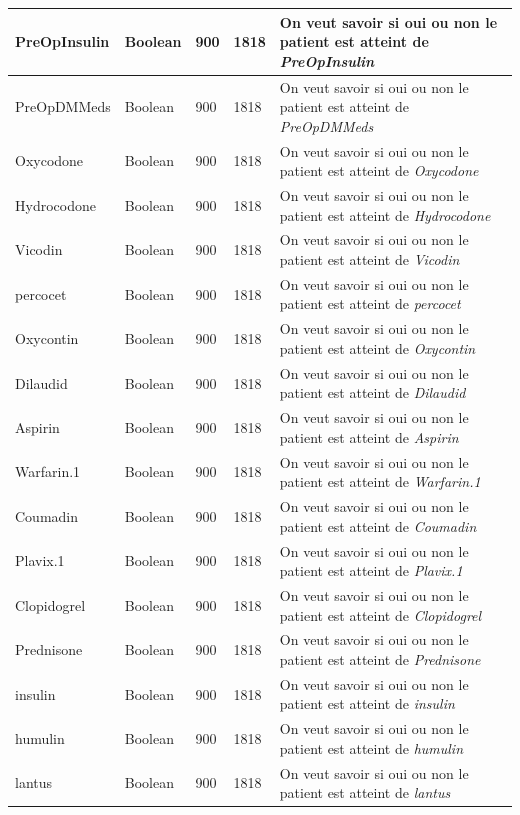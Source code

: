 \documentclass[12pt, french]{report}
\begin{document}
\begin{longtable}{ | p{} | p{} | p{}  | p{} | p{} |  }
PreOpInsulin & Boolean & 900 & 1818& On veut savoir si oui ou non le patient est atteint de \textit{PreOpInsulin} \\ \hline 
PreOpDMMeds & Boolean & 900 & 1818& On veut savoir si oui ou non le patient est atteint de \textit{PreOpDMMeds} \\ \hline 
Oxycodone & Boolean & 900 & 1818& On veut savoir si oui ou non le patient est atteint de \textit{Oxycodone} \\ \hline 
Hydrocodone & Boolean & 900 & 1818& On veut savoir si oui ou non le patient est atteint de \textit{Hydrocodone} \\ \hline 
Vicodin & Boolean & 900 & 1818& On veut savoir si oui ou non le patient est atteint de \textit{Vicodin} \\ \hline 
percocet & Boolean & 900 & 1818& On veut savoir si oui ou non le patient est atteint de \textit{percocet} \\ \hline 
Oxycontin & Boolean & 900 & 1818& On veut savoir si oui ou non le patient est atteint de \textit{Oxycontin} \\ \hline 
Dilaudid & Boolean & 900 & 1818& On veut savoir si oui ou non le patient est atteint de \textit{Dilaudid} \\ \hline 
Aspirin & Boolean & 900 & 1818& On veut savoir si oui ou non le patient est atteint de \textit{Aspirin} \\ \hline 
Warfarin.1 & Boolean & 900 & 1818& On veut savoir si oui ou non le patient est atteint de \textit{Warfarin.1} \\ \hline 
Coumadin & Boolean & 900 & 1818& On veut savoir si oui ou non le patient est atteint de \textit{Coumadin} \\ \hline 
Plavix.1 & Boolean & 900 & 1818& On veut savoir si oui ou non le patient est atteint de \textit{Plavix.1} \\ \hline 
Clopidogrel & Boolean & 900 & 1818& On veut savoir si oui ou non le patient est atteint de \textit{Clopidogrel} \\ \hline 
Prednisone & Boolean & 900 & 1818& On veut savoir si oui ou non le patient est atteint de \textit{Prednisone} \\ \hline 
insulin & Boolean & 900 & 1818& On veut savoir si oui ou non le patient est atteint de \textit{insulin} \\ \hline 
humulin & Boolean & 900 & 1818& On veut savoir si oui ou non le patient est atteint de \textit{humulin} \\ \hline 
lantus & Boolean & 900 & 1818& On veut savoir si oui ou non le patient est atteint de \textit{lantus} \\ \hline 

\end{longtable}
\end{document}
